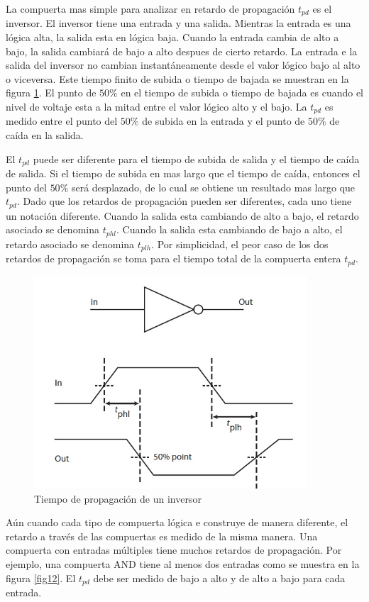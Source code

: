 \documentclass[12pt]{book}
\theoremstyle{definition}
\theoremstyle{remark}
\theoremstyle{plain}
\begin{document}
La compuerta mas simple para analizar en retardo de propagación $t_{pd}$ es el inversor. El inversor tiene una entrada y una salida. Mientras la entrada es una lógica alta, la salida esta en lógica baja. Cuando la entrada cambia de alto a bajo, la salida cambiará de bajo a alto despues de cierto retardo. La entrada e la salida del inversor no cambian instantáneamente desde el valor lógico bajo al alto o viceversa. Este tiempo finito de subida o tiempo de bajada se muestran en la figura \ref{fig11}. El punto de $50\%$ en el tiempo de subida o tiempo de bajada es cuando el nivel de voltaje esta a la mitad entre el valor lógico alto y el bajo. La $t_{pd}$ es medido entre el punto del $50\%$ de subida en la entrada y el punto de $50\%$ de caída en la salida.

El $t_{pd}$ puede ser diferente para el tiempo de subida de salida y el tiempo de caída de salida. Si el tiempo de subida en mas largo que el tiempo de caída, entonces el punto del $50\%$ será desplazado, de lo cual se obtiene un resultado mas largo que $t_{pd}$. Dado que los retardos de propagación pueden ser diferentes, cada uno tiene un notación diferente. Cuando la salida esta cambiando de alto a bajo, el retardo asociado se denomina $t_{phl}$. Cuando la salida esta cambiando de bajo a alto, el retardo asociado se denomina $t_{plh}$. Por simplicidad, el peor caso de los dos retardos de propagación se toma para el tiempo total de la compuerta entera $t_{pd}$.


\begin{figure}
\centering
\includegraphics[width=4in]{InverterDelay.jpg}
\caption{Tiempo de propagación de un inversor}
\label{fig11}
\end{figure}

Aún cuando cada tipo de compuerta lógica e construye de manera diferente, el retardo a través de las compuertas es medido de la misma manera. Una compuerta con entradas múltiples tiene muchos retardos de propagación. Por ejemplo, una compuerta AND tiene al menos dos entradas como se muestra en la figura \ref{fig12}. El $t_{pd}$ debe ser medido de bajo a alto y de alto a bajo para cada entrada.
\end{document}
